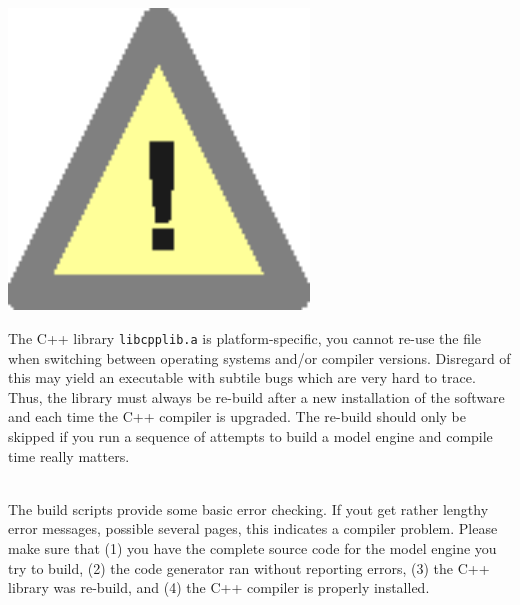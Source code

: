 \medskip
\begin{minipage}{0.15\textwidth}
  \includegraphics[width=0.6\textwidth]{../../_common/fig/symbols_warning.eps}   
\end{minipage}
\begin{minipage}{0.8\textwidth}
The C++ library \verb!libcpplib.a! is platform-specific, \ie{} you cannot re-use the file when switching between operating systems and/or compiler versions. Disregard of this may yield an executable with subtile bugs which are very hard to trace. Thus, the library must always be re-build after a new installation of the  software and each time the C++ compiler is upgraded. The re-build should only be skipped if you run a sequence of attempts to build a model engine and compile time really matters.
\end{minipage} \\

The build scripts provide some basic error checking. If yout get rather lengthy error messages, possible several pages, this indicates a compiler problem. Please make sure that (1) you have the complete source code for the model engine you try to build, (2) the code generator ran without reporting errors, (3) the C++ library was re-build, and (4) the C++ compiler is properly installed.

